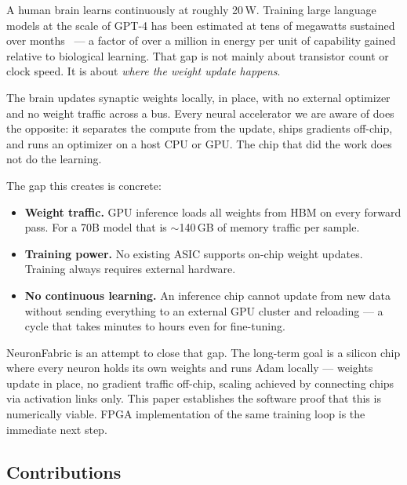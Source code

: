 \documentclass[11pt]{article}
\begin{document}
A human brain learns continuously at roughly 20\,W.
Training large language models at the scale of GPT-4 has been estimated at tens of megawatts
sustained over months~\cite{patterson2022carbon} --- a factor of over a million in energy
per unit of capability gained relative to biological learning.
That gap is not mainly about transistor count or clock speed.
It is about \emph{where the weight update happens}.

The brain updates synaptic weights locally, in place, with no external optimizer and
no weight traffic across a bus. Every neural accelerator we are aware of does the
opposite: it separates the compute from the update, ships gradients off-chip, and
runs an optimizer on a host CPU or GPU. The chip that did the work does not do the learning.

The gap this creates is concrete:

\begin{itemize}
  \item \textbf{Weight traffic.} GPU inference loads all weights from HBM on every
    forward pass. For a 70B model that is $\sim$140\,GB of memory traffic per sample.
  \item \textbf{Training power.} No existing ASIC supports on-chip weight updates.
    Training always requires external hardware.
  \item \textbf{No continuous learning.} An inference chip cannot update from new data
    without sending everything to an external GPU cluster and reloading --- a cycle
    that takes minutes to hours even for fine-tuning.
\end{itemize}

NeuronFabric is an attempt to close that gap. The long-term goal is a silicon chip
where every neuron holds its own weights and runs Adam locally --- weights update in
place, no gradient traffic off-chip, scaling achieved by connecting chips via
activation links only. This paper establishes the software proof that
this is numerically viable. FPGA implementation of the same training loop is the immediate next step.

\subsection{Contributions}
\end{document}
